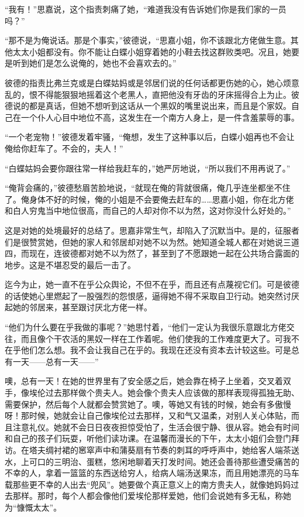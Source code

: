 \par “我有！”思嘉说，这个指责刺痛了她，“难道我没有告诉她们你是我们家的一员吗？”
\par “那不是为俺说话。那是个事实，”彼德说，“思嘉小姐，你不该跟北方佬做生意。其他太太小姐都没有。你不能让白蝶小姐穿着她的小鞋去找这群败类吧。况且，她要是听到她们是怎么说俺的，她也不会喜欢去的。”
\par 彼德的指责比弗兰克或是白蝶姑妈或是邻居们说的任何话都更伤她的心，她心烦意乱的，恨不得能狠狠地摇着这个老黑人，直把他没有牙齿的牙床摇得合上为止。彼德说的都是真话，但她不想听到这话从一个黑奴的嘴里说出来，而且是个家奴。自己在一个仆人心目中地位不高，这发生在一个南方人身上，是一件含羞蒙辱的事。
\par “一个老宠物！”彼德发着牢骚，“俺想，发生了这种事以后，白蝶小姐再也不会让俺给你赶车了。不会的，夫人！”
\par “白蝶姑妈会要你跟往常一样给我赶车的，”她严厉地说，“所以我们不用再说了。”
\par “俺背会痛的，”彼德愁眉苦脸地说，“就现在俺的背就很痛，俺几乎连坐都坐不住了。俺身体不好的时候，俺的小姐是不会要俺去赶车的……思嘉小姐，你在北方佬和白人穷鬼当中地位很高，而自己的人却对你不以为然，这对你没什么好处的。”
\par 这是对她的处境最好的总结了。思嘉非常生气，却陷入了沉默当中。是的，征服者们是很赞赏她，但她的家人和邻居却对她不以为然。她知道全城人都在对她说三道四，而现在，连彼德都对她不以为然了，甚至到了不愿跟她一起在公共场合露面的地步。这是不堪忍受的最后一击了。
\par 迄今为止，她一直不在乎公众舆论，不但不在乎，而且还有点蔑视它们。可是彼德的话使她心里燃起了一股强烈的怨恨感，逼得她不得不采取自卫行动。她突然讨厌起她的邻居来，甚至跟讨厌北方佬一样。
\par “他们为什么要在乎我做的事呢？”她思忖着，“他们一定认为我很乐意跟北方佬交往，而且像个干农活的黑奴一样在工作着呢。他们使我的工作难度更大了。可我不在乎他们怎么想。我不会让我自己在乎的。我现在还没有资本去计较这些。可是总有一天——总有一天——”
\par 噢，总有一天！在她的世界里有了安全感之后，她会靠在椅子上坐着，交叉着双手，像埃伦过去那样做个贵夫人。她会像个贵夫人应该做的那样表现得孤独无助、需要保护，然后每个人就都会赞赏她了。噢，等她又有钱的时候，她会有多傲慢呀！那时候，她就会让自己像埃伦过去那样，又和气又温柔，对别人关心体贴，而且注意礼仪。她就不会日日夜夜担惊受怕了，生活会很宁静、很从容。她会有时间和自己的孩子们玩耍，听他们读功课。在温馨而漫长的下午，太太小姐们会登门拜访。在塔夫绸衬裙的窸窣声中和蒲葵扇有节奏的刺耳的呼呼声中，她给客人端茶送水，上可口的三明治、蛋糕，悠闲地聊着天打发时间。她还会善待那些遭受痛苦的不幸的人，拿着一篮篮的东西送给穷人，给病人端汤送果冻，而且用她漂亮的马车载那些更不幸的人出去“兜风”。她要做个真正意义上的南方贵夫人，就像她妈妈过去那样。那时，每个人都会像他们爱埃伦那样爱她，他们会说她有多无私，称她为“慷慨太太”。
